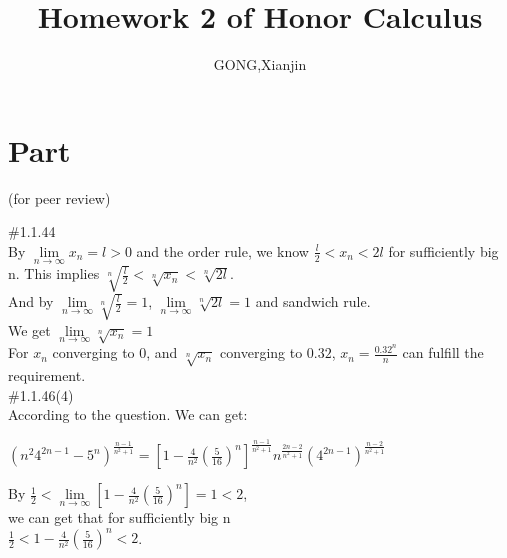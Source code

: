 \documentclass{article}
\author{GONG,Xianjin}
\title{Homework 2 of Honor Calculus}
\begin{document}
\maketitle

\section{\textcolor[rgb]{0.70,0.00,0.00}{Part \uppercase\expandafter{}}}(for peer review)

\vspace{3.5mm}

\textcolor[rgb]{0.00,0.00,0.50}{\#1.1.44}\\

By $\lim \limits_{n \to \infty}x_n=l>0$ and the order rule, we know $\frac{l}{2}<x_n<2l$ for sufficiently big n. This implies $\sqrt[n]{\frac{l}{2}}<\sqrt[n]{x_n}<\sqrt[n]{2l}$.\\

And by $\lim \limits_{n \to \infty}\sqrt[n]{\frac{l}{2}} = 1$, $\lim \limits_{n \to \infty}\sqrt[n]{2l} = 1$ and sandwich rule.\\

We get $\lim \limits_{n \to \infty}\sqrt[n]{x_n} = 1$\\

For $x_n$ converging to 0, and $\sqrt[n]{x_n}$ converging to $0.32$, $x_n = \frac{0.32^n}{n}$ can fulfill the requirement.\\

\textcolor[rgb]{0.00,0.00,0.50}{\#1.1.46(4)}\\

According to the question. We can get:\\

\centerline{$(n^{2}4^{2n-1}-5^{n})^{\frac{n-1}{n^2+1}} = \left[1- \frac{4}{n^2} \left(\frac{5}{16} \right)^n \right]^{\frac{n-1}{n^2+1}} n^{\frac{2n-2}{n^2+1}} \left(4^{2n-1} \right)^{\frac{n-2}{n^2+1}}$}

\vspace{3.5mm}

By
$\frac{1}{2}< \lim \limits_{n \to \infty} \left[1- \frac{4}{n^2}\left(\frac{5}{16}\right)^n\right]=1<2$,\\

we can get that for sufficiently big n\\

$\frac{1}{2}<1-\frac{4}{n^2}\left(\frac{5}{16}\right)^n<2$.\\
\end{document}
